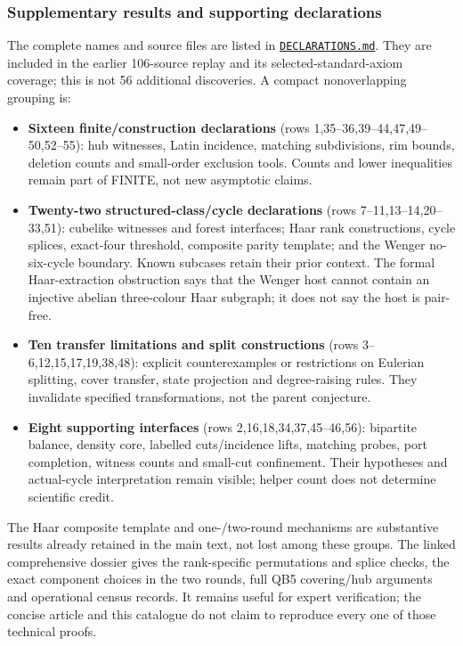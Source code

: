 \documentclass[
  11pt,
]{article}
\providecommand{\tightlist}{%
  \setlength{\itemsep}{0pt}\setlength{\parskip}{0pt}}
\begin{document}
\subsubsection{Supplementary results and supporting
declarations}\label{supplementary-results-and-supporting-declarations}

The complete names and source files are listed in
\href{https://github.com/roberthuynh/erdos-585/blob/1efc324e155ef0b6a7081c5f695c6c825e7debef/findings/supplement/lean/DECLARATIONS.md}{\texttt{DECLARATIONS.md}}.
They are included in the earlier 106-source replay and its
selected-standard-axiom coverage; this is not 56 additional discoveries.
A compact nonoverlapping grouping is:

\begin{itemize}
\tightlist
\item
  \textbf{Sixteen finite/construction declarations} (rows
  1,35--36,39--44,47,49--50,52--55): hub witnesses, Latin incidence,
  matching subdivisions, rim bounds, deletion counts and small-order
  exclusion tools. Counts and lower inequalities remain part of FINITE,
  not new asymptotic claims.
\item
  \textbf{Twenty-two structured-class/cycle declarations} (rows
  7--11,13--14,20--33,51): cubelike witnesses and forest interfaces;
  Haar rank constructions, cycle splices, exact-four threshold,
  composite parity template; and the Wenger no-six-cycle boundary. Known
  subcases retain their prior context. The formal Haar-extraction
  obstruction says that the Wenger host cannot contain an injective
  abelian three-colour Haar subgraph; it does not say the host is
  pair-free.
\item
  \textbf{Ten transfer limitations and split constructions} (rows
  3--6,12,15,17,19,38,48): explicit counterexamples or restrictions on
  Eulerian splitting, cover transfer, state projection and
  degree-raising rules. They invalidate specified transformations, not
  the parent conjecture.
\item
  \textbf{Eight supporting interfaces} (rows 2,16,18,34,37,45--46,56):
  bipartite balance, density core, labelled cuts/incidence lifts,
  matching probes, port completion, witness counts and small-cut
  confinement. Their hypotheses and actual-cycle interpretation remain
  visible; helper count does not determine scientific credit.
\end{itemize}

The Haar composite template and one-/two-round mechanisms are
substantive results already retained in the main text, not lost among
these groups. The linked comprehensive dossier gives the rank-specific
permutations and splice checks, the exact component choices in the two
rounds, full QB5 covering/hub arguments and operational census records.
It remains useful for expert verification; the concise article and this
catalogue do not claim to reproduce every one of those technical proofs.
\end{document}
